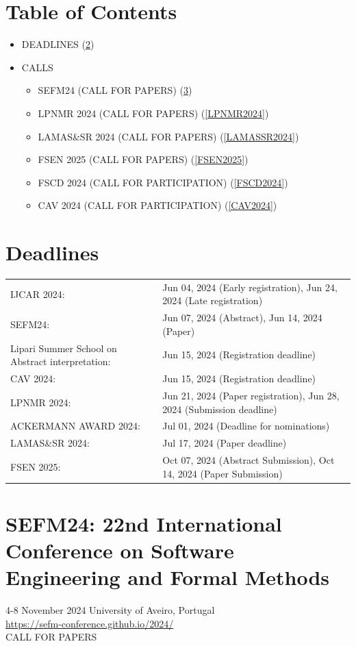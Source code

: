 \documentclass[prodmode,acmtecs]{acmsmall} %
\begin{document}
\section{Table of Contents}\begin{itemize}\item DEADLINES (\cref{deadlines}) 
 
\item CALLS 
 
\begin{itemize}\item SEFM24 (CALL FOR PAPERS) (\cref{SEFM24})
\item LPNMR 2024 (CALL FOR PAPERS) (\cref{LPNMR2024})
\item LAMAS\&SR 2024 (CALL FOR PAPERS) (\cref{LAMASSR2024})
\item FSEN 2025 (CALL FOR PAPERS) (\cref{FSEN2025})
\item FSCD 2024 (CALL FOR PARTICIPATION) (\cref{FSCD2024})
\item CAV 2024 (CALL FOR PARTICIPATION) (\cref{CAV2024})
\end{itemize} 
\end{itemize}\section{Deadlines}\label{deadlines}\begin{tabulary}{\linewidth}{LL}IJCAR 2024:  & Jun 04, 2024 (Early registration), Jun 24, 2024 (Late registration) \\
SEFM24:  & Jun 07, 2024 (Abstract), Jun 14, 2024 (Paper) \\
Lipari Summer School on Abstract interpretation:  & Jun 15, 2024 (Registration deadline) \\
CAV 2024:  & Jun 15, 2024 (Registration deadline) \\
LPNMR 2024:  & Jun 21, 2024 (Paper registration), Jun 28, 2024 (Submission deadline) \\
ACKERMANN AWARD 2024:  & Jul 01, 2024 (Deadline for nominations) \\
LAMAS\&SR 2024:  & Jul 17, 2024 (Paper  deadline) \\
FSEN 2025:  & Oct 07, 2024 (Abstract Submission), Oct 14, 2024 (Paper Submission) \\
\end{tabulary}
\section{SEFM24: 22nd International Conference on Software Engineering and Formal Methods}\label{SEFM24}  4-8 November 2024 University of Aveiro, Portugal\\ 
  \href{https://sefm-conference.github.io/2024/}{https://sefm-conference.github.io/2024/}\\ 
CALL FOR PAPERS 
\end{document}
